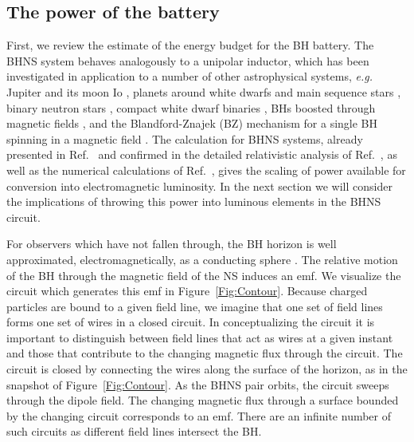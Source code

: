 \subsection{The power of the battery}
\label{Orbital inspiral battery}
First, we review the estimate of the energy budget for the BH
battery. The BHNS system behaves analogously to a unipolar inductor, which has been investigated in application 
to a number of other astrophysical systems, \textit{e.g.} Jupiter and 
its moon Io \citep{GLB:1969}, planets around white dwarfs \citep{Li:1998} and main sequence stars \citep{LaineLinI:2012,LaineLinII:2012}, 
binary neutron stars \citep{Vietri:1996,Piro:2012, DLai:2012, Palenzuela:2013}, 
compact white dwarf binaries \citep{Wu:2002, Dall'Osso:2006, Dall'Osso:2007, 
DLai:2012}, BHs boosted through magnetic fields 
\citep{Lyut:2011, Penna:2015}, and the Blandford-Znajek (BZ) mechanism \citep{BZ:1977} for a single BH spinning in a magnetic field \citep[for recent numerical work on the BZ mechanism see \textit{e.g.}][]{PalenzuelaBZ:2011, Kiuchi:2015}. The calculation for BHNS systems, 
already presented in Ref.\ \cite{McL:2011}
and confirmed in the detailed relativistic analysis of
Ref.\ \cite{DL:2013}, as well as the numerical calculations
of Ref.\ \cite{Paschalidis:2013}, gives the scaling of power available
for conversion into electromagnetic luminosity. In the next section we
will consider the implications of throwing this power into luminous
elements in the BHNS circuit.

For observers which have not fallen through, the BH horizon is well
approximated, electromagnetically, as a conducting sphere
\citep{MPBook}. The relative motion of the BH through the magnetic
field of the NS induces an emf. We visualize the circuit which
generates this emf in Figure\ \ref{Fig:Contour}. Because charged
particles are bound to a given field line, we imagine that one set of
field lines forms one set of wires in a closed circuit. In
conceptualizing the circuit it is important to distinguish between
field lines that act as wires at a given instant and those that
contribute to the changing magnetic flux through the circuit. The
circuit is closed by connecting the wires along the surface of the
horizon, as in the snapshot of Figure\ \ref{Fig:Contour}.  As the BHNS
pair orbits, the circuit sweeps through the dipole field. The changing
magnetic flux through a surface bounded by the changing circuit
corresponds to an emf. There are an infinite number of such circuits
as different field lines intersect the BH.


